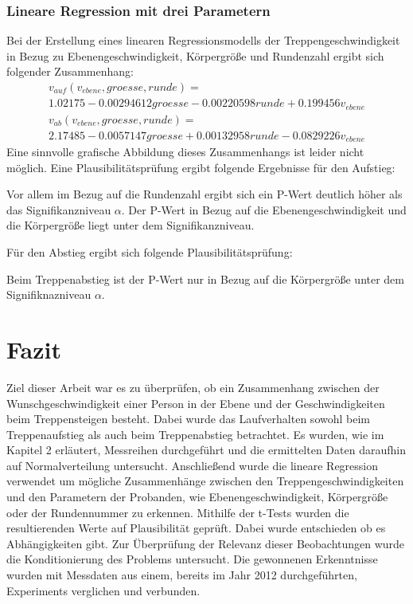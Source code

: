 \subsubsection{Lineare Regression mit drei Parametern}
Bei der Erstellung eines linearen Regressionsmodells der Treppengeschwindigkeit in Bezug zu Ebenengeschwindigkeit, Körpergröße und Rundenzahl ergibt sich folgender Zusammenhang:
\begin{multline}
	v_{auf}(v_{ebene}, groesse, runde) = \\ 
	1.02175 -0.00294612 groesse -0.00220598 runde +0.199456 v_{ebene}
\end{multline}
\begin{multline}
	v_{ab}(v_{ebene}, groesse, runde ) = \\ 
	2.17485 -0.0057147 groesse+0.00132958 runde -0.0829226 v_{ebene}
\end{multline}
Eine sinnvolle grafische Abbildung dieses Zusammenhangs ist leider nicht möglich. 
Eine Plausibilitätsprüfung ergibt folgende Ergebnisse für den Aufstieg:

Vor allem im Bezug auf die Rundenzahl ergibt sich ein P-Wert deutlich höher als das Signifikanzniveau $\alpha$. Der P-Wert in Bezug auf die Ebenengeschwindigkeit und die Körpergröße liegt unter dem Signifikanzniveau.


Für den Abstieg ergibt sich folgende Plausibilitätsprüfung:

Beim Treppenabstieg ist der P-Wert nur in Bezug auf die Körpergröße unter dem Signifiknazniveau $\alpha$.

\section{Fazit}

Ziel dieser Arbeit war es zu überprüfen, ob ein Zusammenhang zwischen der Wunschgeschwindigkeit einer Person in der Ebene und der Geschwindigkeiten beim Treppensteigen besteht. Dabei wurde das Laufverhalten sowohl beim Treppenaufstieg als auch beim Treppenabstieg betrachtet. Es wurden, wie im Kapitel 2 erläutert, Messreihen durchgeführt und die ermittelten Daten daraufhin auf Normalverteilung untersucht. Anschließend wurde die lineare Regression verwendet um mögliche Zusammenhänge zwischen den Treppengeschwindigkeiten und den Parametern der Probanden, wie Ebenengeschwindigkeit, Körpergröße oder der Rundennummer zu erkennen. Mithilfe der t-Tests wurden die resultierenden Werte auf Plausibilität geprüft. Dabei wurde entschieden ob es Abhängigkeiten gibt. Zur Überprüfung der Relevanz dieser Beobachtungen wurde die Konditionierung des Problems untersucht. Die gewonnenen Erkenntnisse wurden mit Messdaten aus einem, bereits im Jahr 2012 durchgeführten, Experiments verglichen und verbunden.

